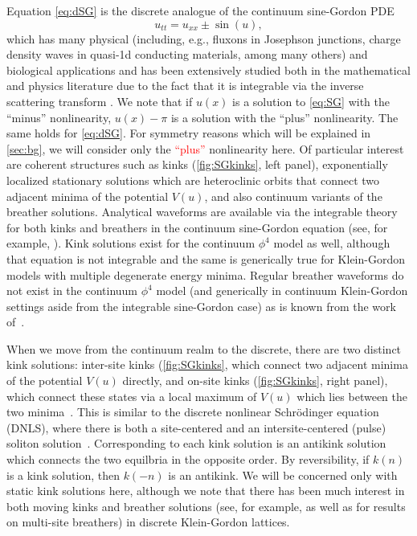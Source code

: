\documentclass[12pt,reqno]{amsart}
\newcommand{\revised}[1]{ \textcolor{red}{#1} }
\newcommand{\revisedd}[2]{ \textcolor{blue}{#1} }
\begin{document}
Equation \cref{eq:dSG} is the discrete analogue of the 
continuum sine-Gordon PDE
\begin{equation}\label{eq:SG}
	u_{tt} = u_{xx} \pm \sin(u),
\end{equation}
which has many physical (including, e.g.,
fluxons in Josephson junctions, charge density
waves in quasi-1d conducting materials, among many others)
and biological applications \cites{SGbook,Ivancevic2013} and has been extensively studied both in the mathematical and physics literature due to the fact that it is integrable via the inverse scattering transform \cite{SolitonBook1}. 
We note that if $u(x)$ is a solution to \cref{eq:SG} with the ``minus'' nonlinearity, $u(x) - \pi$ is a solution with the ``plus'' nonlinearity. The same holds for \cref{eq:dSG}. For symmetry reasons which will be explained in \cref{sec:bg}, we will consider only the \revised{``plus''} nonlinearity here.
Of particular interest are coherent structures such as kinks (\cref{fig:SGkinks}, left panel), exponentially localized stationary solutions which 
are heteroclinic orbits that connect two adjacent minima of the potential $V(u)$, and also continuum variants of the breather
solutions. Analytical waveforms are available via the 
integrable theory for both kinks and breathers in the continuum sine-Gordon equation (see, for example, \cite{SGchapter}). Kink  solutions exist for the continuum $\phi^4$ model as well, although that equation is not integrable \cites{SGbook,KevrekidisWeinstein2000}
and the same is generically true for Klein-Gordon
models
with multiple degenerate energy minima.
Regular breather waveforms do not exist
in the continuum $\phi^4$ model (and generically in continuum
Klein-Gordon settings aside from the integrable
sine-Gordon case) as is known from the work of~\cite{segur}. 

When we move from the continuum realm to the discrete, there are two distinct kink solutions: inter-site kinks (\cref{fig:SGkinks}, which connect two adjacent minima of the potential $V(u)$ directly, and on-site kinks (\cref{fig:SGkinks}, right panel), which connect these states via a local maximum of $V(u)$ which lies between the two minima~\cite{peyrard}. 
This is similar to the discrete nonlinear Schr{\"o}dinger equation (DNLS), where there is both a site-centered and an intersite-centered (pulse) soliton solution~\cite{Kevrekidis2009}. Corresponding to each kink solution is an antikink solution which connects the two equilbria in the opposite order. By reversibility, if $k(n)$ is a kink solution, then $k(-n)$ is an antikink. We will be concerned only with static kink solutions here, although we note that there has been much interest in both moving kinks \cites{Aigner2003,Iooss2006,Cisneros2008} and breather solutions (see, for example, \cites{SGbook} as well as \cites{Pelinovsky2012,Cuevas2011} for results on multi-site breathers) in discrete Klein-Gordon lattices.
\end{document}
